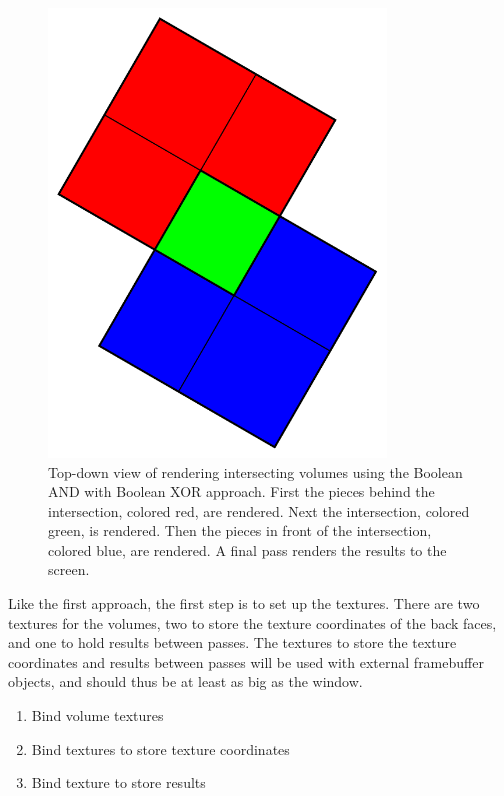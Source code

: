 \documentclass{report}
\begin{document}
\begin{figure}
\centering
\includegraphics[width=0.8\textwidth]{boolean-xor.pdf}
\caption{
Top-down view of rendering intersecting volumes using the Boolean AND with
Boolean XOR approach.  First the pieces behind the intersection, colored red,
are rendered.  Next the intersection, colored green, is rendered.  Then the
pieces in front of the intersection, colored blue, are rendered.  A final pass
renders the results to the screen.
}
\label{boolean-xor}
\end{figure}

Like the first approach, the first step is to set up the textures.  There are
two textures for the volumes, two to store the texture coordinates of the back
faces, and one to hold results between passes.  The textures to store the
texture coordinates and results between passes will be used with external
framebuffer objects, and should thus be at least as big as the window.

\begin{enumerate}
  \item Bind volume textures
  \item Bind textures to store texture coordinates
  \item Bind texture to store results
\end{enumerate}
\end{document}
